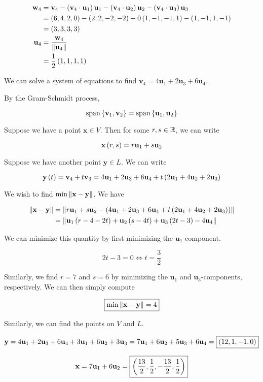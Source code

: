 \documentclass{article}
\begin{document}
\begin{align*}
  \textbf{w}_4 &= \textbf{v}_4 - \left ( \textbf{v}_4 \cdot \textbf{u}_1 \right) \textbf{u}_1 - \left ( \textbf{v}_4 \cdot \textbf{u}_2 \right) \textbf{u}_2 - \left ( \textbf{v}_4 \cdot \textbf{u}_3 \right) \textbf{u}_3 \\
           &= \left ( 6, 4, 2, 0 \right) - \left ( 2, 2, -2, -2 \right) - 0 \left ( 1, -1, -1, 1 \right) - \left ( 1, -1, 1, -1 \right) \\
           &= \left ( 3, 3, 3, 3 \right) \\
  \textbf{u}_4 &= \frac{\textbf{w}_4}{\left\lVert\textbf{u}_4\right\rVert} \\
           &= \frac{1}{2} \left ( 1, 1, 1, 1 \right) \\
\end{align*}

We can solve a system of equations to find $\bm{v}_4 = 4 \bm{u}_1 + 2 \bm{u}_3 + 6 \bm{u}_4$.

By the Gram-Schmidt process,

$$
\operatorname{span} \left \{ \textbf{v}_1, \textbf{v}_2 \right \} = \operatorname{span} \left \{ \textbf{u}_1, \textbf{u}_2 \right \}
$$

Suppose we have a point $\bm{x} \in V$.
Then for some $r, s \in \mathbb R$, we can write

$$
\textbf{x} \left ( r, s \right) = r \textbf{u}_1 + s \textbf{u}_2
$$

Suppose we have another point $\bm{y} \in L$.
We can write

$$
\textbf{y} \left ( t \right) = \textbf{v}_4 + t \textbf{v}_3 = 4 \textbf{u}_1 + 2 \textbf{u}_3 + 6 \textbf{u}_4 + t \left ( 2\textbf{u}_1 + 4 \textbf{u}_2 + 2 \textbf{u}_3 \right)
$$

We wish to find $\min \left\lVert\textbf{x} - \textbf{y}\right\rVert$.
We have

\begin{align*}
  \left\lVert\textbf{x} - \textbf{y}\right\rVert &= \left\lVert r \textbf{u}_1 + s \textbf{u}_2 - \left ( 4 \textbf{u}_1 + 2 \textbf{u}_3 + 6 \textbf{u}_4 + t \left ( 2\textbf{u}_1 + 4 \textbf{u}_2 + 2 \textbf{u}_3 \right) \right)\right\rVert \\
  &= \left\lVert\textbf{u}_1 \left ( r - 4 - 2t \right) + \textbf{u}_2 \left ( s - 4t \right) + \textbf{u}_3 \left ( 2t - 3 \right) - 4 \textbf{u}_4\right\rVert \\
\end{align*}

We can minimize this quantity by first minimizing the $\bm{u}_1$-component.

$$
2t - 3 = 0 \iff t = \frac{3}{2}
$$

Similarly, we find $r=7$ and $s=6$ by minimizing the $\bm{u}_1$ and $\bm{u}_3$-components, respectively.
We can then simply compute

$$
\boxed{\min \left\lVert\textbf{x} - \textbf{y}\right\rVert = 4}
$$

Similarly, we can find the points on $V$ and $L$.

$$
\textbf{y} = 4 \textbf{u}_1 + 2 \textbf{u}_3 + 6 \textbf{u}_4 + 3 \textbf{u}_1 + 6 \textbf{u}_2 + 3 \textbf{u}_3 = 7 \textbf{u}_1 + 6 \textbf{u}_2 + 5 \textbf{u}_3 + 6 \textbf{u}_4 = \boxed{\left ( 12, 1, -1, 0 \right)} 
$$

$$
\textbf{x} = 7 \textbf{u}_1 + 6 \textbf{u}_2 = \boxed{\left ( \frac{13}{2}, \frac{1}{2}, -\frac{13}{2}, \frac{1}{2} \right)}
$$
\end{document}
